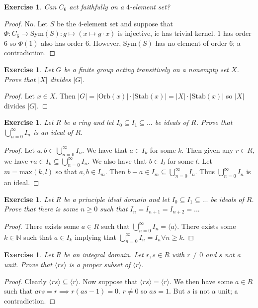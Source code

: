 \documentclass{article}
\newtheorem{exercise}[theorem]{Exercise}
\begin{document}
\begin{exercise}
Can $C_6$ act faithfully on a $4$-element set?
\end{exercise}
\begin{proof}
No. Let $S$ be the $4$-element set and suppose that $\Phi\colon C_6\to\text{Sym}(S):g\mapsto(x\mapsto g\cdot x)$ is injective, ie has trivial kernel. $1$ has order $6$ so $\Phi(1)$ also has order $6$. However, $\text{Sym}(S)$ has no element of order $6$; a contradiction.
\end{proof}

\begin{exercise}
Let $G$ be a finite group acting transitively on a nonempty set $X$. Prove that $|X|$ divides $|G|$.
\end{exercise}
\begin{proof}
Let $x\in X$. Then $|G|=|\text{Orb}(x)|\cdot|\text{Stab}(x)|=|X|\cdot|\text{Stab}(x)|$ so $|X|$ divides $|G|$.
\end{proof}

\begin{exercise}
Let $R$ be a ring and let $I_0\subseteq I_1\subseteq...$ be ideals of $R$. Prove that $\bigcup_{n=0}^\infty I_n$ is an ideal of $R$.
\end{exercise}
\begin{proof}
Let $a,b\in \bigcup_{n=0}^\infty I_n$. We have that $a\in I_k$ for some $k$. Then given any $r\in R$, we have $ra\in I_k\subseteq \bigcup_{n=0}^\infty I_n$. We also have that $b\in I_l$ for some $l$. Let $m=\text{max}(k,l)$ so that $a,b\in I_m$. Then $b-a\in I_m\subseteq\bigcup_{n=0}^\infty I_n$. Thus $\bigcup_{n=0}^\infty I_n$ is an ideal.
\end{proof}

\begin{exercise}
Let $R$ be a principle ideal domain and let $I_0\subseteq I_1\subseteq ...$ be ideals of $R$. Prove that there is some $n\geq0$ such that $I_n=I_{n+1}=I_{n+2}=...$
\end{exercise}
\begin{proof}
There exists some $a\in R$ such that $\bigcup_{n=0}^\infty I_n=\langle a\rangle$. There exists some $k\in\mathbb{N}$ such that $a\in I_k$ implying that $\bigcup_{n=0}^\infty I_n= I_n\forall n\geq k$.
\end{proof}

\begin{exercise}
Let $R$ be an integral domain. Let $r,s\in R$ with $r\neq 0$ and $s$ not a unit. Prove that $\langle rs\rangle$ is a proper subset of $\langle r \rangle$.
\end{exercise}
\begin{proof}
Clearly $\langle rs\rangle\subseteq\langle r\rangle$. Now suppose that $\langle rs\rangle=\langle r\rangle$. We then have some $a\in R$ such that $ars=r\implies r(as-1)=0$. $r\neq 0$ so $as=1$. But $s$ is not a unit; a contradiction.
\end{proof}
\end{document}
